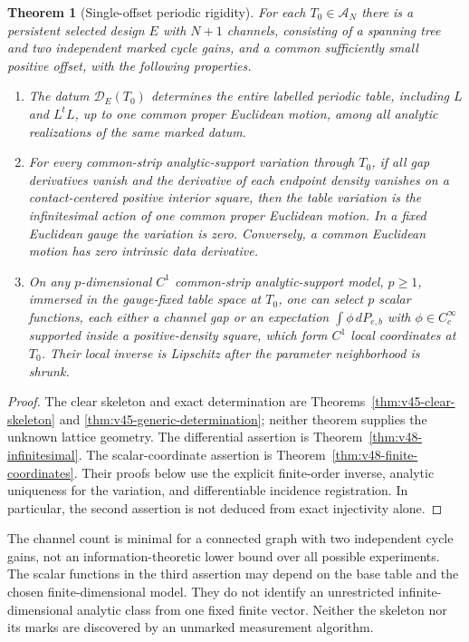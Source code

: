 \newtheorem{structuraltheorem}{Theorem}
\renewcommand{\thestructuraltheorem}{\Alph{structuraltheorem}}
\begin{structuraltheorem}[Single-offset periodic rigidity]
\label{thm:v48-main}
For each $T_0\in\mathscr A_N$ there is a persistent selected design $E$
with $N+1$ channels, consisting of a spanning tree and two independent
marked cycle gains, and a common sufficiently small positive offset,
with the following properties.
\begin{enumerate}
\item The datum $\mathcal D_E(T_0)$ determines the entire labelled periodic
table, including $L$ and $L^tL$, up to one common proper Euclidean motion,
among all analytic realizations of the same marked datum.
\item For every common-strip analytic-support variation through $T_0$,
if all gap derivatives vanish and the derivative of each endpoint density
vanishes on a contact-centered positive interior square, then the table variation is the
infinitesimal action of one common proper Euclidean motion.  In a fixed
Euclidean gauge the variation is zero.  Conversely, a common Euclidean
motion has zero intrinsic data derivative.
\item On any $p$-dimensional $C^1$ common-strip analytic-support model,
$p\ge1$, immersed in the gauge-fixed table space at $T_0$, one can select
$p$ scalar functions, each either a channel gap or an expectation
$\int\phi\,dP_{e,b}$ with $\phi\in C_c^\infty$ supported inside a
positive-density square, which form $C^1$ local coordinates at $T_0$.
Their local inverse is Lipschitz after the parameter neighborhood is
shrunk.
\end{enumerate}
\end{structuraltheorem}

\begin{proof}
The clear skeleton and exact determination are
Theorems~\ref{thm:v45-clear-skeleton} and
\ref{thm:v45-generic-determination}; neither theorem supplies the unknown
lattice geometry.  The differential assertion is
Theorem~\ref{thm:v48-infinitesimal}.  The scalar-coordinate assertion is
Theorem~\ref{thm:v48-finite-coordinates}.  Their proofs below use the
explicit finite-order inverse, analytic uniqueness for the variation,
and differentiable incidence registration.  In particular, the second
assertion is not deduced from exact injectivity alone.
\end{proof}

The channel count is minimal for a connected graph with two independent
cycle gains, not an information-theoretic lower bound over all possible
experiments.  The scalar functions in the third assertion may depend on
the base table and the chosen finite-dimensional model.  They do not
identify an unrestricted infinite-dimensional analytic class from one
fixed finite vector.  Neither the skeleton nor its marks are discovered
by an unmarked measurement algorithm.

